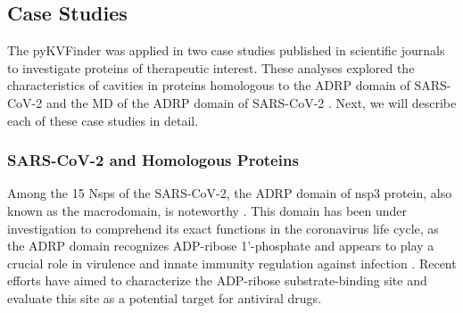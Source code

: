 \documentclass[Ingles]{phdthesis}
\begin{document}
\subsection{Case Studies}

The pyKVFinder was applied in two case studies published in scientific journals to investigate proteins of therapeutic interest. These analyses explored the characteristics of cavities in proteins homologous to the \ac{ADRP} domain of \ac{SARS-CoV-2} and the \acs{MD} of the \acs{ADRP} domain of \acs{SARS-CoV-2} \cite{guerra2021}. Next, we will describe each of these case studies in detail.

\subsubsection{SARS-CoV-2 and Homologous Proteins \label{sec:pykvfinder-sars-cov-2}}

Among the 15 \ac{Nsps} of the \acs{SARS-CoV-2}, the \acs{ADRP} domain of nsp3 protein, also known as the macrodomain, is noteworthy \cite{michalska2020}. This domain has been under investigation to comprehend its exact functions in the coronavirus life cycle, as the \acs{ADRP} domain recognizes ADP-ribose 1'-phosphate and appears to play a crucial role in virulence and innate immunity regulation against infection \cite{fehr2016,claverie2020}. Recent efforts have aimed to characterize the ADP-ribose substrate-binding site and evaluate this site as a potential target for antiviral drugs.
\end{document}
